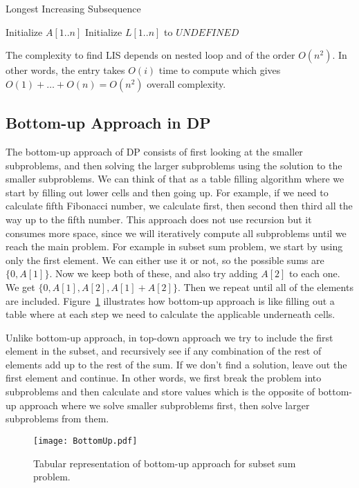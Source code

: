 \documentclass[11pt]{article}
\theoremstyle{definition}
\begin{document}
\begin{algorithm}[H]
\caption{Longest Increasing Subsequence}\label{LIS}
\begin{algorithmic}[1]
\State Initialize $A[1..n]$
\State Initialize $L[1..n]$ to $UNDEFINED$
    \EndIf
\EndFor
\State {}
\EndFunction
\State{\null}
 
    \State {}
\EndIf
{}
    \State {}
\EndIf
{}
        \EndIf
    \EndIf
\EndFor
\State {}
\EndFunction
\end{algorithmic}
\end{algorithm}

The complexity to find LIS depends on nested loop and of the order $O(n^2)$. In other words, the entry  takes $O(i)$ time to compute which gives $O(1)+\ldots+O(n)= O(n^2)$ overall complexity.

\subsection{Bottom-up Approach in DP}
The bottom-up approach of DP consists of first looking at the smaller subproblems, and then solving the larger subproblems using the solution to the smaller subproblems. We can think of that as a table filling algorithm where we start by filling out lower cells and then going up. For example, if we need to calculate fifth Fibonacci number, we calculate first, then second then third all the way up to the fifth number. This approach does not use recursion but it consumes more space, since we will iteratively compute all subproblems until we reach the main problem. For example in subset sum problem,  we start by using only the first element. We can either use it or not, so the possible sums are $\{0, A[1]\}$. Now we keep both of these, and also try adding $A[2]$ to each one. We get $\{0, A[1], A[2], A[1]+A[2]\}$. Then we repeat until all of the elements are included. Figure~\ref{fig:bottom-up} illustrates how bottom-up approach is like filling out a table where at each step we need to calculate the applicable underneath cells.

Unlike bottom-up approach, in top-down approach we try to include the first element in the subset, and recursively see if any combination of the rest of elements add up to the rest of the sum. If we don't find a solution, leave out the first element and continue. In other words, we first break the problem into subproblems and then calculate and store values which is the opposite of bottom-up approach where we solve smaller subproblems first, then solve larger subproblems from them.
\begin{figure}[tbh]
\centering
\texttt{[image: BottomUp.pdf]}
\caption{Tabular representation of bottom-up approach for subset sum problem.}
\label{fig:bottom-up}
\end{figure}
\end{document}
